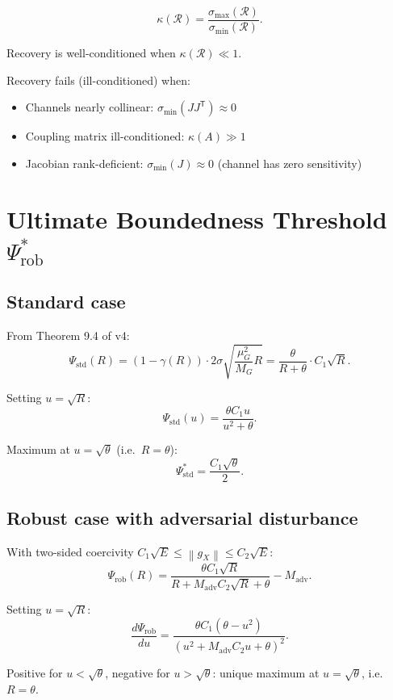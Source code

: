 \documentclass[11pt,a4paper]{article}
\theoremstyle{definition}
\newcommand{\T}{^{\mathsf{T}}}
\newcommand{\norm}[1]{\left\|#1\right\|}
\newcommand{\gX}{g_X}
\newcommand{\adv}{\mathrm{adv}}
\begin{document}
\[
\kappa(\mathcal{R}) = \frac{\sigma_{\max}(\mathcal{R})}{\sigma_{\min}(\mathcal{R})}.
\]

Recovery is well-conditioned when $\kappa(\mathcal{R}) \ll 1$.

Recovery fails (ill-conditioned) when:
\begin{itemize}
\item Channels nearly collinear: $\sigma_{\min}(JJ\T) \approx 0$
\item Coupling matrix ill-conditioned: $\kappa(A) \gg 1$
\item Jacobian rank-deficient: $\sigma_{\min}(J) \approx 0$ (channel has zero sensitivity)
\end{itemize}

\section{Ultimate Boundedness Threshold $\Psi^*_\mathrm{rob}$}

\subsection{Standard case}

From Theorem 9.4 of v4:
\[
\Psi_\mathrm{std}(R) = (1-\gamma(R))\cdot 2\sigma\sqrt{\frac{\mu_G^2}{M_G}R}
= \frac{\theta}{R+\theta}\cdot C_1\sqrt{R}.
\]

Setting $u = \sqrt{R}$:
\[
\Psi_\mathrm{std}(u) = \frac{\theta C_1 u}{u^2 + \theta}.
\]

Maximum at $u = \sqrt{\theta}$ (i.e.\ $R = \theta$):
\[
\Psi^*_\mathrm{std} = \frac{C_1\sqrt{\theta}}{2}.
\]

\subsection{Robust case with adversarial disturbance}

With two-sided coercivity $C_1\sqrt{E} \leq \norm{\gX} \leq C_2\sqrt{E}$:
\[
\Psi_\mathrm{rob}(R) = \frac{\theta C_1\sqrt{R}}{R + M_\adv C_2\sqrt{R} + \theta} - M_\adv.
\]

Setting $u = \sqrt{R}$:
\[
\frac{d\Psi_\mathrm{rob}}{du} = \frac{\theta C_1(\theta - u^2)}{(u^2 + M_\adv C_2 u + \theta)^2}.
\]

Positive for $u < \sqrt{\theta}$, negative for $u > \sqrt{\theta}$: unique maximum at $u = \sqrt{\theta}$, i.e.\ $R = \theta$.
\end{document}
